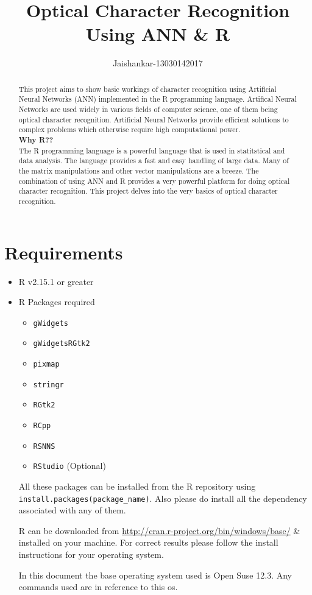 \documentclass[a4paper,12pt]{report}
\title{Optical Character Recognition Using ANN \& R}
\author{Jaishankar-13030142017}
\date{}
\begin{document}
\maketitle

\tableofcontents{}

\begin{abstract}
This project aims to show basic workings of character recognition using Artificial Neural Networks (ANN) implemented in the R programming language.
Artifical Neural Networks are used widely in various fields of computer science, one of them being optical character recognition.
Artificial Neural Networks provide efficient solutions to complex problems which otherwise require high computational power. \\

\textbf{Why R??}\\

The R programming language is a powerful language that is used in statitstical and data analysis. The language provides a fast and easy 
handling of large data. Many of the matrix manipulations and other vector manipulations are a breeze. 
The combination of using ANN and R provides a very powerful platform for doing optical character recognition. 
This project delves into the very basics of optical character recognition.


\end{abstract}

\section*{Requirements}
\begin{itemize}
 \item R v2.15.1 or greater
 \item R Packages required
  \begin{itemize}
   \item \verb+gWidgets+
   \item \verb+gWidgetsRGtk2+
   \item \verb+pixmap+
   \item \verb+stringr+
   \item \verb+RGtk2+
   \item \verb+RCpp+
   \item \verb+RSNNS+
    \item \verb+RStudio+ (Optional)
  \end{itemize}
  \vskip 1cm
  
  All these packages can be installed from the R repository using\\ \verb+install.packages(package_name)+. Also please do install all the dependency associated with any of them.
  
  R can be downloaded from \url{http://cran.r-project.org/bin/windows/base/} \& installed on your machine. For correct results please follow
  the install instructions for your operating system. 
  
  In this document the base operating system used is Open Suse 12.3. Any commands used are in reference to this os.

\end{itemize}
\end{document}
